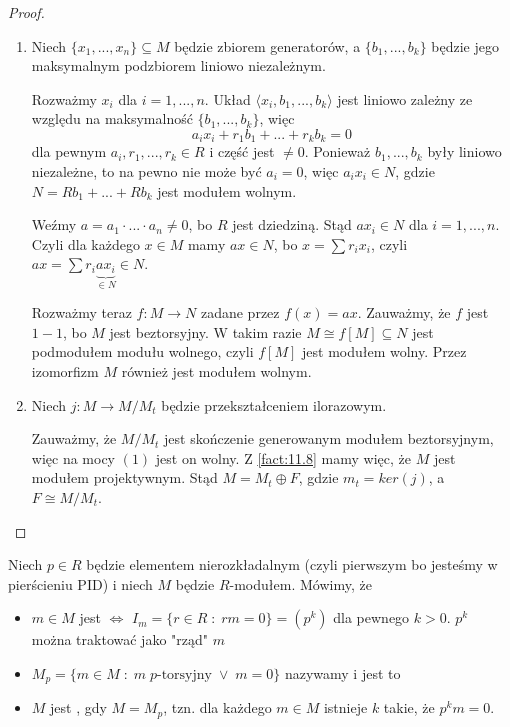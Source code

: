 \begin{proof}
  \begin{enumerate}
    \item Niech $\{x_1,...,x_n\}\subseteq M$ będzie zbiorem generatorów, a $\{b_1,...,b_k\}$ będzie jego maksymalnym podzbiorem liniowo niezależnym.

      Rozważmy $x_i$ dla $i=1,...,n$. Układ $\langle x_i,b_1,...,b_k\rangle$ jest liniowo zależny ze względu na maksymalność $\{b_1,...,b_k\}$, więc
      $$a_ix_i+r_1b_1+...+r_kb_k=0$$
      dla pewnym $a_i,r_1,...,r_k\in R$ i część jest $\neq 0$. Ponieważ $b_1,...,b_k$ były liniowo niezależne, to na pewno nie może być $a_i=0$, więc $a_ix_i\in N$, gdzie $N=Rb_1+...+Rb_k$ jest modułem wolnym.

      Weźmy $a=a_1\cdot...\cdot a_n\neq 0$, bo $R$ jest dziedziną. Stąd $ax_i\in N$ dla $i=1,...,n$. Czyli dla każdego $x\in M$ mamy $ax\in N$, bo $x=\sum r_ix_i$, czyli $ax=\sum r_i\underbrace{ax_i}_{\in N}\in N$.

      Rozważmy teraz $f:M\to N$ zadane przez $f(x)=ax$. Zauważmy, że $f$ jest $1-1$, bo $M$ jest beztorsyjny. W takim razie $M\cong f[M]\subseteq N$ jest podmodułem modułu wolnego, czyli $f[M]$ jest modułem wolny. Przez izomorfizm $M$ również jest modułem wolnym.
  \item Niech $j:M\to M/M_t$ będzie przekształceniem ilorazowym. 

    Zauważmy, że $M/M_t$ jest skończenie generowanym modułem beztorsyjnym, więc na mocy $(1)$ jest on wolny. Z \ref{fact:11.8} mamy więc, że $M$ jest modułem projektywnym. Stąd $M=M_t\oplus F$, gdzie $m_t=ker(j)$, a $F\cong M/M_t$.
  \end{enumerate}
\end{proof}

\begin{definition}
  Niech $p\in R$ będzie elementem nierozkładalnym (czyli pierwszym bo jesteśmy w pierścieniu PID) i niech $M$ będzie $R$-modułem. Mówimy, że

  \begin{itemize}
    \item $m\in M$ jest  $\iff$ $I_m=\{r\in R\;:\;rm=0\}=(p^k)$ dla pewnego $k>0$. $p^k$ można traktować jako "rząd" $m$
    \item $M_p=\{m\in M\;:\; m\;p\text{-torsyjny}\;\lor\;m=0\}$ nazywamy  i jest to 
    \item $M$ jest , gdy $M=M_p$, tzn. dla każdego $m\in M$ istnieje $k$ takie, że $p^km=0$.
  \end{itemize}
\end{definition}


